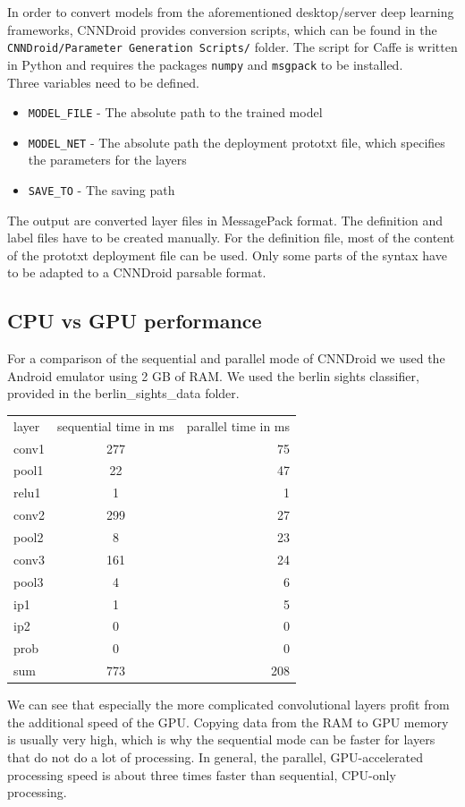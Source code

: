 In order to convert models from the aforementioned desktop/server deep learning frameworks, CNNDroid provides conversion scripts, which can be found in the \texttt{CNNDroid/Parameter Generation Scripts/} folder. The script for Caffe is written in Python and requires the packages \lstinline[language=python]{numpy} and \lstinline[language=python]{msgpack} to be installed.\\
Three variables need to be defined.
\begin{itemize}
  \item{\texttt{MODEL\_FILE} - The absolute path to the trained model}
  \item{\texttt{MODEL\_NET} - The absolute path the deployment prototxt file, which specifies the parameters for the layers}
  \item{\texttt{SAVE\_TO} - The saving path}
\end{itemize}
The output are converted layer files in MessagePack format. The definition and label files have to be created manually. For the definition file, most of the content of the prototxt deployment file can be used. Only some parts of the syntax have to be adapted to a CNNDroid parsable format.\\
\newpage
\subsection{CPU vs GPU performance}
For a comparison of the sequential and parallel mode of CNNDroid we used the Android emulator using 2 GB of RAM. We used the berlin sights classifier, provided in the berlin\_sights\_data folder.

\begin{center}
  \begin{tabular}{l|c|r}
    layer & sequential time in ms & parallel time in ms \\
    conv1 & 277 & 75\\
    pool1 & 22 & 47\\
    relu1 & 1 & 1\\
    conv2 & 299 & 27\\
    pool2 & 8 & 23\\
    conv3 & 161 & 24\\
    pool3 & 4 & 6\\
    ip1 & 1 & 5\\
    ip2 & 0 & 0\\
    prob & 0 & 0\\
    sum & 773 & 208\\
  \end{tabular}
\end{center}

We can see that especially the more complicated convolutional layers profit from the additional speed of the GPU. Copying data from the RAM to GPU memory is usually very high, which is why the sequential mode can be faster for layers that do not do a lot of processing. In general, the parallel, GPU-accelerated processing speed is about three times faster than sequential, CPU-only processing.